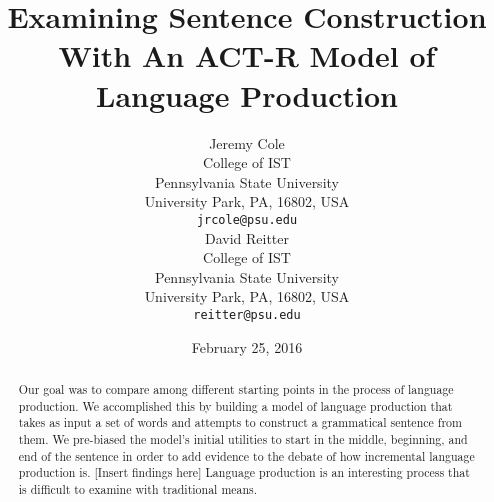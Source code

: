 \documentclass[11pt]{article}
\title{Examining Sentence Construction With An ACT-R Model of Language Production}
\author{Jeremy Cole \\
College of IST \\
Pennsylvania State University \\
University Park, PA, 16802, USA \\
  {\tt jrcole@psu.edu} \\ \And
David Reitter \\
College of IST \\
Pennsylvania State University \\
University Park, PA, 16802, USA \\
  {\tt reitter@psu.edu} \\
}
\date{February 25, 2016}
\begin{document}
\maketitle
\begin{abstract}
Our goal was to compare among different starting points in the process of language production. We accomplished this by building a model of language production that takes as input a set of words and attempts to construct a grammatical sentence from them. We pre-biased the model's initial utilities to start in the middle, beginning, and end of the sentence in order to add evidence to the debate of how incremental language production is. [Insert findings here]  Language production is an interesting process that is difficult to examine with traditional means. 

\end{abstract}











%
%
%
%



\end{document}
